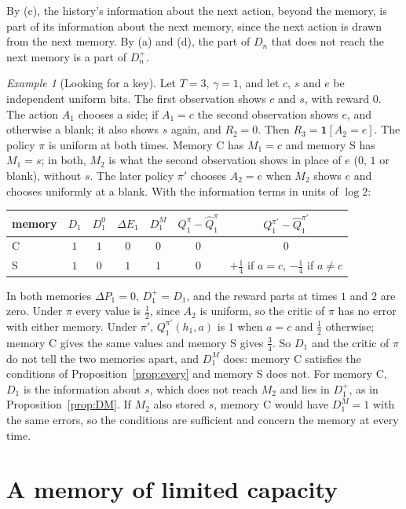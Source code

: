 \documentclass{article}
\theoremstyle{definition}
\theoremstyle{remark}
\newtheorem{example}[proposition]{Example}
\newcommand{\dE}{\Delta E}
\newcommand{\dP}{\Delta P}
\begin{document}
By (c), the history's information about the next action, beyond the memory, is part of its information about the next memory, since the next action is drawn from the next memory. By (a) and (d), the part of $D_n$ that does not reach the next memory is a part of $D^+_n$.

\begin{example}[Looking for a key]\label{ex:key}
Let $T=3$, $\gamma=1$, and let $c$, $s$ and $e$ be independent uniform bits. The first observation shows $c$ and $s$, with reward $0$. The action $A_1$ chooses a side; if $A_1=c$ the second observation shows $e$, and otherwise a blank; it also shows $s$ again, and $R_2=0$. Then $R_3=\mathbf 1[A_2=e]$. The policy $\pi$ is uniform at both times. Memory C has $M_1=c$ and memory S has $M_1=s$; in both, $M_2$ is what the second observation shows in place of $e$ ($0$, $1$ or blank), without $s$. The later policy $\pi'$ chooses $A_2=e$ when $M_2$ shows $e$ and chooses uniformly at a blank. With the information terms in units of $\log2$:
\begin{center}
\small
\begin{tabular}{lcccccc}
\toprule
memory & $D_1$ & $D^0_1$ & $\dE_1$ & $D^M_1$ & $Q^\pi_1-\hat Q^\pi_1$ & $Q^{\pi'}_1-\hat Q^{\pi'}_1$\\
\midrule
C & $1$ & $1$ & $0$ & $0$ & $0$ & $0$\\
S & $1$ & $0$ & $1$ & $1$ & $0$ & $+\tfrac14$ if $a=c$, $-\tfrac14$ if $a\ne c$\\
\bottomrule
\end{tabular}
\end{center}
In both memories $\dP_1=0$, $D^+_1=D_1$, and the reward parts at times $1$ and $2$ are zero. Under $\pi$ every value is $\tfrac12$, since $A_2$ is uniform, so the critic of $\pi$ has no error with either memory. Under $\pi'$, $Q^{\pi'}_1(h_1,a)$ is $1$ when $a=c$ and $\tfrac12$ otherwise; memory C gives the same values and memory S gives $\tfrac34$. So $D_1$ and the critic of $\pi$ do not tell the two memories apart, and $D^M_1$ does: memory C satisfies the conditions of Proposition~\ref{prop:every} and memory S does not. For memory C, $D_1$ is the information about $s$, which does not reach $M_2$ and lies in $D^+_1$, as in Proposition~\ref{prop:DM}. If $M_2$ also stored $s$, memory C would have $D^M_1=1$ with the same errors, so the conditions are sufficient and concern the memory at every time.
\end{example}

\section{A memory of limited capacity}\label{sec:capacity}
\end{document}
